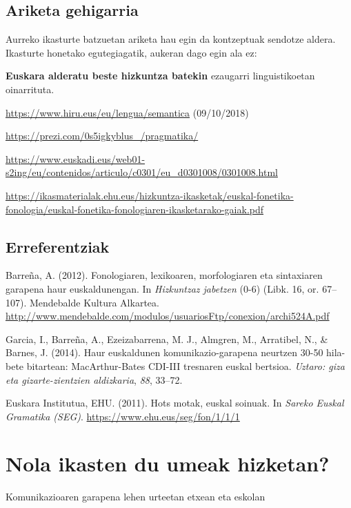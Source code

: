 \documentclass[
]{book}
\begin{document}
\hypertarget{T2A5}{%
\section*{Ariketa gehigarria}\label{T2A5}}

Aurreko ikasturte batzuetan ariketa hau egin da kontzeptuak sendotze aldera. Ikasturte honetako egutegiagatik, aukeran dago egin ala ez:

\textbf{Euskara alderatu beste hizkuntza batekin} ezaugarri linguistikoetan oinarrituta.

\url{https://www.hiru.eus/eu/lengua/semantica} (09/10/2018)

\url{https://prezi.com/0s5igkyblus_/pragmatika/}

\url{https://www.euskadi.eus/web01-s2ing/eu/contenidos/articulo/c0301/eu_d0301008/0301008.html}

\url{https://ikasmaterialak.ehu.eus/hizkuntza-ikasketak/euskal-fonetika-fonologia/euskal-fonetika-fonologiaren-ikasketarako-gaiak.pdf}

\hypertarget{T2E}{%
\section*{Erreferentziak}\label{T2E}}

Barreña, A. (2012). Fonologiaren, lexikoaren, morfologiaren eta sintaxiaren garapena haur euskaldunengan. In \emph{Hizkuntzaz jabetzen} (0-6) (Libk. 16, or. 67--107). Mendebalde Kultura Alkartea. \url{http://www.mendebalde.com/modulos/usuariosFtp/conexion/archi524A.pdf}

Garcia, I., Barreña, A., Ezeizabarrena, M. J., Almgren, M., Arratibel, N., \& Barnes, J. (2014). Haur euskaldunen komunikazio-garapena neurtzen 30-50 hila-bete bitartean: MacArthur-Bates CDI-III tresnaren euskal bertsioa. \emph{Uztaro: giza eta gizarte-zientzien aldizkaria}, \emph{88}, 33--72.

Euskara Institutua, EHU. (2011). Hots motak, euskal soinuak. In \emph{Sareko Euskal Gramatika (SEG)}. \url{https://www.ehu.eus/seg/fon/1/1/1}

\hypertarget{nola-ikasten-du-umeak-hizketan}{%
\chapter{Nola ikasten du umeak hizketan?}\label{nola-ikasten-du-umeak-hizketan}}

Komunikazioaren garapena lehen urteetan etxean eta eskolan
\end{document}
